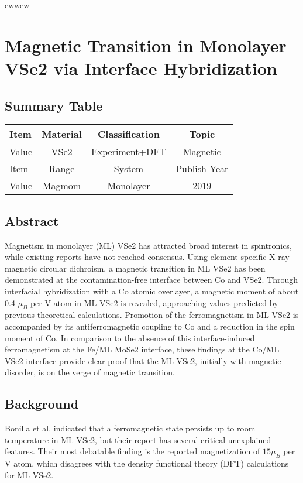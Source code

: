ewwew\setchapterpreamble[u]{\margintoc}
\chapter{Magnetic Transition in Monolayer VSe2 via Interface Hybridization\cite{doi:10.1021/acsnano.9b02996}}

\section{Summary Table}

\begin{table}[h]
    \begin{tabular}{lccc}
    \hline
    Item  & Material         & Classification & Topic        \\  \hline
    Value & VSe2             & Experiment+DFT & Magnetic     \\  \hline
    Item  & Range            & System         & Publish Year \\  \hline
    Value & Magmom           & Monolayer      & 2019         \\  \hline
    \end{tabular}
\end{table}

\section{Abstract}
Magnetism in monolayer (ML) VSe2 has attracted broad interest in spintronics, while existing reports have not reached consensus. Using element-specific X-ray magnetic circular dichroism, a magnetic transition in ML VSe2 has been demonstrated at the contamination-free interface between Co and VSe2. Through interfacial hybridization with a Co atomic overlayer, a magnetic moment of about 0.4 $\mu_B$ per V atom in ML VSe2 is revealed, approaching values predicted by previous theoretical calculations. Promotion of the ferromagnetism in ML VSe2 is accompanied by its antiferromagnetic coupling to Co and a reduction in the spin moment of Co. In comparison to the absence of this interface-induced ferromagnetism at the Fe/ML MoSe2 interface, these findings at the Co/ML VSe2 interface provide clear proof that the ML VSe2, initially with magnetic disorder, is on the verge of magnetic transition.

\section{Background}
Bonilla et al. indicated that a ferromagnetic state persists up to room temperature in ML VSe2, but their report has several critical unexplained features. Their most debatable finding is the reported magnetization of $15 \mu_B$ per V atom, which disagrees with the density functional theory (DFT) calculations for ML VSe2.

